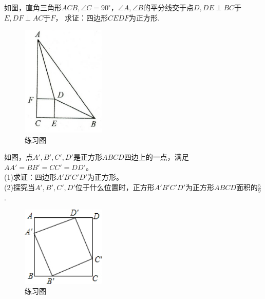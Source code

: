 \documentclass{ecnuthesis}
\begin{document}
\begin{problem}
    如图，直角三角形$ACB,\angle C=90^\circ$，$\angle A,\angle B$的平分线交于点$D,DE\perp BC$于$E,DF\perp AC$于$F$，
    求证：四边形$CEDF$为正方形.
\end{problem}
\begin{figure}[H]
\centering
\includegraphics[width=4cm]{picture/6118.png}
\caption{练习图}
\end{figure}
\begin{problem}
    如图，点$A',B',C',D'$是正方形$ABCD$四边上的一点，满足$AA'=BB'=CC'=DD'$。\\
    (1)求证：四边形$A'B'C'D'$为正方形。 \\
    (2)探究当$A',B',C',D'$位于什么位置时，正方形$A'B'C'D'$为正方形$ABCD$面积的$\frac{5}{9}$. \\
\end{problem}
\begin{figure}[H]
\centering
\includegraphics[width=4cm]{picture/643.png}
\caption{练习图}
\end{figure}
\clearpage
\end{document}
